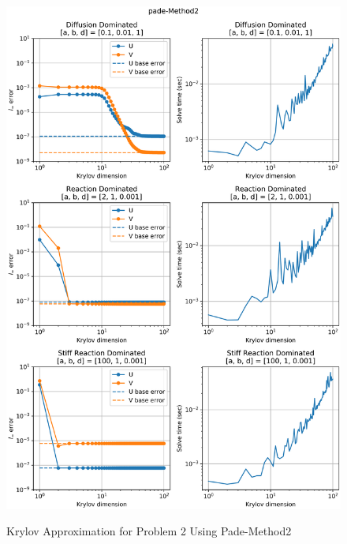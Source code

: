 \begin{figure}[t]
  \centering
  \includegraphics[width=5.75in]{images/pade-Method2KrylovProblem2.png}\\
  \caption{Krylov Approximation for Problem 2 Using Pade-Method2}
  \label{fig:errorProblem2padeM2Krylov}
\end{figure} 

